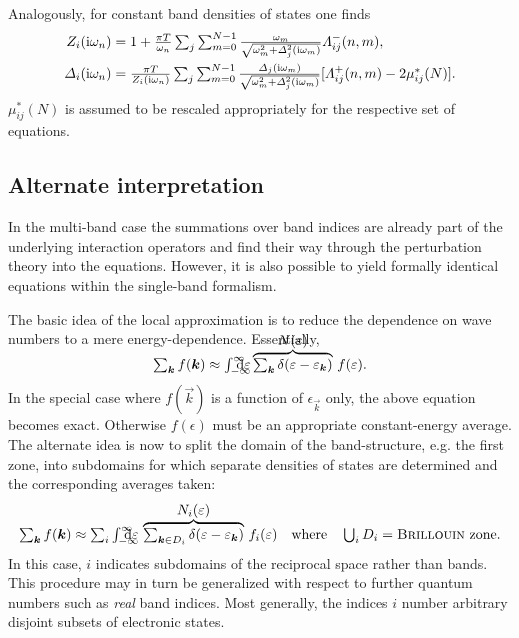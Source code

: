 Analogously, for constant band densities of states one finds \cite[Eqs.~1,
2]{NicolCarbotte05}
%
\begin{subequations} \label{CDOS multi-band Eliashberg equations}
    \begin{align}
        Z_i(\I \omega_n)
        &= 1 + \frac{\pi T}{\omega_n} \sum_j \sum_{m = 0}^{N - 1}
        \frac{\omega_m}{\sqrt{\omega_m^2 + \Delta_j^2(\I \omega_m)}}
        \Lambda_{i j}^-(n, m),
        \\
        \Delta_i(\I \omega_n) &= \frac{\pi T}{Z_i(\I \omega_n)}
        \sum_j \sum_{m = 0}^{N - 1}
        \frac
            {\Delta_j(\I \omega_m)}
            {\sqrt{\omega_m^2 + \Delta_j^2(\I \omega_m)}}
        [\Lambda_{i j}^+(n, m) - 2 \mu^*_{i j}(N)].
    \end{align}
\end{subequations}
%
$\mu^*_{i j}(N)$ is assumed to be rescaled appropriately for the respective set
of equations.

\subsection{Alternate interpretation}

In the multi-band case the summations over band indices are already part of the
underlying interaction  operators and find their way through the
 perturbation theory into the  equations.
However, it is also possible to yield formally identical equations within the
single-band formalism.

The basic idea of the local approximation is to reduce the dependence on wave
numbers to a mere energy-dependence. Essentially,
%
\begin{equation*}
    \sum_{\vec k} f(\vec k) \approx
    \int \from{-\infty} \till \infty \D \epsilon \,
    \smash{
        \hyper
            {\sum_{\vec k} \delta(\epsilon - \epsilon_{\vec k})}
            {N(\epsilon)} \,
        f(\epsilon)
        }.
\end{equation*}
%
In the special case where $f(\vec k)$ is a function of $\epsilon_{\vec k}$ only,
the above equation becomes exact. Otherwise $f(\epsilon)$ must be an appropriate
constant-energy average. The alternate idea is now to split the domain of the
band-structure, e.g. the first  zone, into subdomains for which
separate densities of states are determined \cites{EntelPeter76}{Entel76} and
the corresponding averages taken:
%
\begin{equation*}
    \sum_{\vec k} f(\vec k) \approx
    \sum_i \int \from{-\infty} \till \infty \D \epsilon \,
    \hyper
        {\sum_{\vec k \in D_i} \delta(\epsilon - \epsilon_{\vec k})}
        {N_i(\epsilon)} \,
    f_i(\epsilon)
    \quad \text{where} \quad
    \bigcup_i D_i = \text{\name{Brillouin} zone}.
\end{equation*}
%
In this case, $i$ indicates subdomains of the reciprocal space rather than
bands. This procedure may in turn be generalized with respect to further quantum
numbers such as \emph{real} band indices. Most generally, the indices $i$ number
arbitrary disjoint subsets of electronic states.

